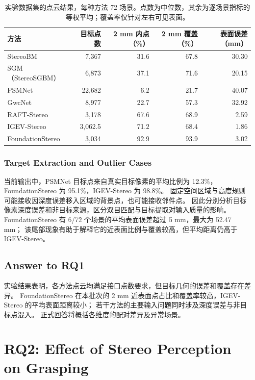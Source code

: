 \documentclass[UTF8,fontset=fandol,a4paper,11pt]{ctexart}
\newcommand{\qyb}[1]{\textcolor{red!75!black}{#1}}
\begin{document}
\begin{table}[H]
\centering\small
\caption{实验数据集的点云结果，每种方法 72 场景。点数为中位数，其余为逐场景指标的等权平均；覆盖率仅针对左右可见表面。}
\label{tab:rq1}
\begin{tabularx}{\linewidth}{Y r r r r}
\toprule
方法 & 目标点数 & 2 mm 内点（\%） & 2 mm 覆盖（\%） & 表面误差（mm） \\
\midrule
StereoBM & 7,367 & 31.6 & 67.8 & 30.30 \\
SGM（StereoSGBM） & 6,873 & 37.1 & 71.6 & 20.15 \\
PSMNet & 22,682 & 6.2 & 21.7 & 40.07 \\
GwcNet & 8,977 & 22.7 & 57.3 & 32.92 \\
RAFT-Stereo & 3,178 & 67.6 & 68.9 & 2.59 \\
IGEV-Stereo & 3,062.5 & 71.2 & 68.4 & 1.86 \\
FoundationStereo & 3,034 & 92.9 & 93.9 & 3.02 \\
\bottomrule
\end{tabularx}
\end{table}

\subsubsection{Target Extraction and Outlier Cases}

当前输出中，PSMNet 目标点来自真实目标像素的平均比例为 12.3\%，FoundationStereo 为 95.1\%，IGEV-Stereo 为 98.8\%。
固定空间区域与高度规则可能接收因深度误差移入区域的背景点，也可能接收邻件点。
因此分别分析目标像素深度误差和非目标来源，区分双目匹配与目标提取对输入质量的影响。
FoundationStereo 有 6/72 个场景的平均表面误差超过 5 mm，最大为 52.47 mm；
该尾部现象有助于解释它的近表面比例与覆盖较高，但平均距离仍高于 IGEV-Stereo。

\subsection{\qyb{Answer to RQ1}}

实验结果表明，各方法点云均满足接口点数要求，但目标几何的误差和覆盖存在差异。
FoundationStereo 在本批次的 2 mm 近表面点占比和覆盖率较高，IGEV-Stereo 的平均表面距离较小；
若干方法的主要输入问题同时涉及深度误差与非目标点混入。
正式回答将概括各维度的配对差异及异常场景。

\section{\qyb{RQ2: Effect of Stereo Perception on Grasping}}
\label{sec:rq2}
\end{document}
